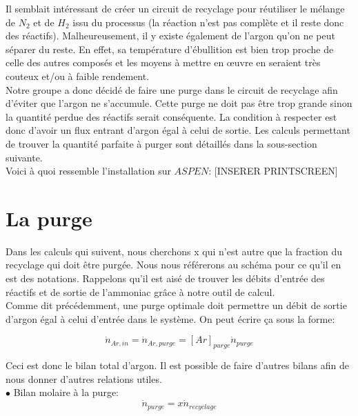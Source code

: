 \documentclass[a4paper, oneside, 12pt]{article}
\begin{document}
Il semblait intéressant de créer un circuit de recyclage pour réutiliser le mélange de $N_2$ et de $H_2$ issu du processus (la réaction n'est pas complète et il reste donc des réactifs). Malheureusement, il y existe également de l'argon qu'on ne peut séparer du reste. En effet, sa température d'ébullition est bien trop proche de celle des autres composés et les moyens à mettre en œuvre en seraient très couteux et/ou à faible rendement. \\
Notre groupe a donc décidé de faire une purge dans le circuit de recyclage afin d'éviter que l'argon ne s'accumule. Cette purge ne doit pas être trop grande sinon la quantité perdue des réactifs serait conséquente. La condition à respecter est donc d'avoir un flux entrant d'argon égal à celui de sortie. Les calculs permettant de trouver la quantité parfaite à purger sont détaillés dans la sous-section suivante.\\
Voici à quoi ressemble l'installation sur $ASPEN$:
[INSERER PRINTSCREEN]

\section{La purge}

Dans les calculs qui suivent, nous cherchons x qui n'est autre que la fraction du recyclage qui doit être purgée. Nous nous référerons au schéma pour ce qu'il en est des notations. Rappelons qu'il est aisé de trouver les débits d'entrée des réactifs et de sortie de l'ammoniac grâce à notre outil de calcul.\\


Comme dit précédemment, une purge optimale doit permettre un débit de sortie d'argon égal à celui d'entrée dans le système. On peut écrire ça sous la forme:

\begin{equation}
\dot{n}_{Ar,in}=\dot{n}_{Ar,purge}=[Ar]_{purge} \dot{n}_{purge}
\end{equation}

Ceci est donc le bilan total d'argon. Il est possible de faire d'autres bilans afin de nous donner d'autres relations utiles.\\

$\bullet$ Bilan molaire à la purge:
\begin{equation}
\dot{n}_{purge}=x \dot{n}_{recyclage}
\end{equation}
\end{document}
